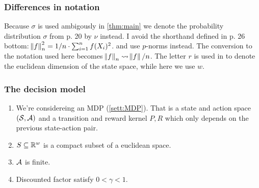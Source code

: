 
\subsubsection{Differences in notation}

Because $\sigma$ is used ambigously in \cref{thm:main}
we denote the probability distribution $\sigma$
from  p. 20 by $\nu$ instead.
I avoid the shorthand defined in
 p. 26 bottom:
$\norm{f}_n^2 = 1/n \cdot \sum_{i=1}^n f(X_i)^2$.
and use $p$-norms instead.
The conversion to the notation used here becomes
$\norm{f}_n \leadsto \norm{f}/n$.
The letter $r$ is used in  to denote the euclidean dimension of
the state space, while here we use $w$.

\subsubsection{The decision model}

\begin{sett}[Fan et al.]
  \leavevmode
  \begin{enumerate}
    \item We're considereing an MDP (\cref{sett:MDP}).
      That is a state and action space
      $(\mathcal{S}, \mathcal{A})$ and a transition and reward kernel $P, R$
      which only depends on the previous state-action pair.
    \item $S \subseteq \mathbb{R}^w$ is a compact subset of a euclidean space.
    \item $\mathcal{A}$ is finite.
    \item Discounted factor satisfy $0 < \gamma < 1$.
  \end{enumerate}
\end{sett}




